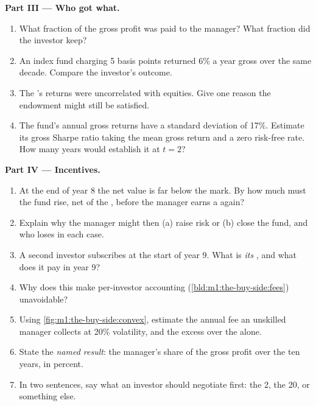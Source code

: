 \begin{problem}
\medskip\noindent\textbf{Part III --- Who got what.}
\begin{enumerate}[resume]
\item What fraction of the gross profit was paid to the manager? What
fraction did the investor keep?
\item An index fund charging 5 basis points returned 6\% a year gross over
the same decade. Compare the investor's outcome.
\item The 's returns were uncorrelated with equities. Give one
reason the endowment might still be satisfied.
\item The fund's annual gross returns have a standard deviation of 17\%.
Estimate its gross Sharpe ratio taking the mean gross return and a zero
risk-free rate. How many years would establish it at $t = 2$?
\end{enumerate}

\medskip\noindent\textbf{Part IV --- Incentives.}
\begin{enumerate}[resume]
\item At the end of year 8 the net value is far below the mark. By how much
must the fund rise, net of the , before the manager earns a
 again?
\item Explain why the manager might then (a) raise risk or (b) close the
fund, and who loses in each case.
\item A second investor subscribes at the start of year 9. What is
\emph{its} , and what  does it pay in year 9?
\item Why does this make per-investor accounting
(\cref{bld:m1:the-buy-side:fees}) unavoidable?
\item Using \cref{fig:m1:the-buy-side:convex}, estimate the annual fee an
unskilled manager collects at 20\% volatility, and the excess over the
 alone.
\item State the \emph{named result}: the manager's share of the gross profit
over the ten years, in percent.
\item In two sentences, say what an investor should negotiate first: the
2, the 20, or something else.
\end{enumerate}
\end{problem}

